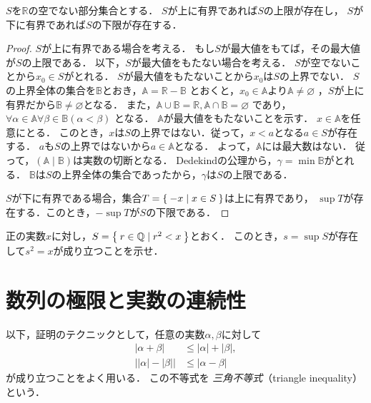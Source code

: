     \begin{thm}[Weierstrassの公理] \label{thm:weierstrass}
      $S$を$\mathbb{R}$の空でない部分集合とする．
      $S$が上に有界であれば$S$の上限が存在し，
      $S$が下に有界であれば$S$の下限が存在する．
    \end{thm}
    \begin{proof} 
      $S$が上に有界である場合を考える．
      もし$S$が最大値をもてば，その最大値が$S$の上限である．
      以下，$S$が最大値をもたない場合を考える．
      $S$が空でないことから$x_0 \in S$がとれる．
      $S$が最大値をもたないことから$x_0$は$S$の上界でない．
      $S$の上界全体の集合を$\mathbb{B}$とおき，$ \mathbb{A} = \mathbb{R} - \mathbb{B}$
      とおくと，$x_0 \in \mathbb{A}$より$\mathbb{A} \neq \varnothing$
      ，$S$が上に有界だから$\mathbb{B} \neq \varnothing$となる． 
      また，$\mathbb{A} \cup \mathbb{B} = \mathbb{R} , 
       \mathbb{A} \cap \mathbb{B} = \varnothing$
      であり，$\forall \alpha \in \mathbb{A} \forall \beta \in \mathbb{B} ( \alpha < \beta)$
      となる．
      $\mathbb{A}$が最大値をもたないことを示す．
      $x \in \mathbb{A}$を任意にとる．
      このとき，$x$は$S$の上界ではない．従って，$x<a$となる$a \in S$が存在する．
      $a$も$S$の上界ではないから$a \in \mathbb{A}$となる．
      よって，$\mathbb{A}$には最大数はない．
      従って，$(\mathbb{A} \mid \mathbb{B})$は実数の切断となる．
      Dedekindの公理から，$\gamma = \min \mathbb{B}$がとれる．
      $\mathbb{B}$は$S$の上界全体の集合であったから，$\gamma$は$S$の上限である．

      $S$が下に有界である場合，集合$T = \Set{ -x \mid x \in S}$は上に有界であり，
      $\sup T$が存在する．このとき，$- \sup T$が$S$の下限である．
    \end{proof}

    \begin{que} \label{que:sqrtdef}
      正の実数$x$に対し，$S = \Set{ r \in \mathbb{Q} \mid r^2 < x}$とおく．
      このとき，$s= \sup S$が存在して$s^2=x$が成り立つことを示せ．
    \end{que}




%
 \section{数列の極限と実数の連続性}
 \label{sec:kyokugensuretu}
     以下，証明のテクニックとして，任意の実数$\alpha ,  \beta$に対して
     \begin{align}
       \lvert \alpha + \beta \rvert & \leq \lvert \alpha \rvert + \lvert \beta \rvert ,
       \label{triangleinq1} \\
       \big \lvert \lvert \alpha \rvert - \lvert \beta \rvert \big \rvert
       & \leq \lvert \alpha - \beta \rvert 
       \label{triangleinq2}
     \end{align}
     が成り立つことをよく用いる．
     この不等式を
     \emph{三角不等式}（triangle inequality）という．
